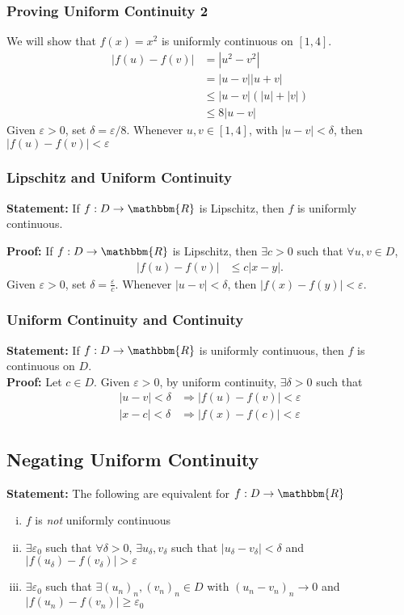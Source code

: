 \documentclass[10pt]{extarticle}
\newcommand{\R}{\mathbbm{R}}
\begin{document}
    \subsubsection{Proving Uniform Continuity 2}%
    We will show that $f(x) = x^2$ is uniformly continuous on $[1,4]$.
    \begin{align*}
      |f(u) - f(v)| &= |u^2 - v^2|\\
                    &= |u-v||u+v|\\
                    &\leq |u-v|\left(|u| + |v|\right)\tag*{Triangle Inequality}\\
                    &\leq 8|u-v|
    \end{align*}
    Given $\varepsilon > 0$, set $\delta = \varepsilon/8$. Whenever $u,v\in [1,4]$, with $|u-v| < \delta$, then $|f(u)-f(v)| < \varepsilon$
    \subsubsection{Lipschitz and Uniform Continuity}%
    \textbf{Statement:} If $f: D\rightarrow \R$ is Lipschitz, then $f$ is uniformly continuous.

    \textbf{Proof:} If $f: D\rightarrow \R$ is Lipschitz, then $\exists c > 0$ such that $\forall u,v\in D$,
    \begin{align*}
      |f(u) - f(v)| &\leq c|x-y|.
    \end{align*}
    Given $\varepsilon > 0$, set $\delta = \frac{\varepsilon}{c}$. Whenever $|u-v| < \delta$, then $|f(x) - f(y)| < \varepsilon$.
    \subsubsection{Uniform Continuity and Continuity}%
    \textbf{Statement:} If $f: D\rightarrow \R$ is uniformly continuous, then $f$ is continuous on $D$.\\

    \textbf{Proof:} Let $c\in D$. Given $\varepsilon > 0$, by uniform continuity, $\exists \delta > 0$ such that 
    \begin{align*}
      |u-v| < \delta &\Rightarrow |f(u)-f(v)| < \varepsilon\\
      |x-c| < \delta &\Rightarrow |f(x)-f(c)| < \varepsilon
    \end{align*}
  \subsection{Negating Uniform Continuity}%
    \textbf{Statement:} The following are equivalent for $f: D\rightarrow \R$
    \begin{enumerate}[(i)]
      \item $f$ is \textit{not} uniformly continuous
      \item $\exists \varepsilon_0$ such that $\forall \delta > 0$, $\exists u_{\delta},v_{\delta}$ such that $|u_{\delta}-v_{\delta}| < \delta$ and $|f(u_{\delta}) - f(v_{\delta})| > \varepsilon$
      \item $\exists \varepsilon_0$ such that $\exists (u_n)_n,(v_n)_n\in D$ with $\left(u_n - v_n\right)_n \rightarrow 0$ and $|f(u_n) - f(v_n)| \geq \varepsilon_0$
    \end{enumerate}
\end{document}
